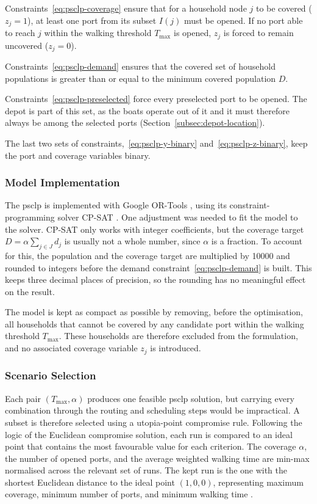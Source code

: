 \documentclass[12pt]{article}
\begin{document}
Constraints~\eqref{eq:psclp-coverage} ensure that for a household node \(j\) to be covered (\(z_j = 1\)), at least one port from its subset \(I(j)\) must be opened. If no port able to reach \(j\) within the walking threshold \(T_{\max}\) is opened, \(z_j\) is forced to remain uncovered (\(z_j = 0\)).

Constraints~\eqref{eq:psclp-demand} ensures that the covered set of household populations is greater than or equal to the minimum covered population \(D\).

Constraints~\eqref{eq:psclp-preselected} force every preselected port to be opened. The depot is part of this set, as the boats operate out of it and it must therefore always be among the selected ports (Section~\ref{subsec:depot-location}).

The last two sets of constraints,~\eqref{eq:psclp-y-binary} and~\eqref{eq:psclp-z-binary}, keep the port and coverage variables binary.

\subsubsection{Model Implementation}
\label{subsubsec:psclp-implementation}

The \ac{psclp} is implemented with Google OR-Tools \parencite{ortools}, using its constraint-programming solver CP-SAT \parencite{cpsat}. One adjustment was needed to fit the model to the solver. CP-SAT only works with integer coefficients, but the coverage target \(D = \alpha \sum_{j \in J} d_j\) is usually not a whole number, since \(\alpha\) is a fraction. To account for this, the population and the coverage target are multiplied by \num{10000} and rounded to integers before the demand constraint~\eqref{eq:psclp-demand} is built. This keeps three decimal places of precision, so the rounding has no meaningful effect on the result.

The model is kept as compact as possible by removing, before the optimisation, all households that cannot be covered by any candidate port within the walking threshold \(T_{\max}\). These households are therefore excluded from the formulation, and no associated coverage variable \(z_j\) is introduced.

\subsubsection{Scenario Selection}
\label{subsubsec:scenario-selection}

Each pair \((T_{\max}, \alpha)\) produces one feasible \ac{psclp} solution, but carrying every combination through the routing and scheduling steps would be impractical. A subset is therefore selected using a utopia-point compromise rule. Following the logic of the Euclidean compromise solution, each run is compared to an ideal point that contains the most favourable value for each criterion. The coverage \(\alpha\), the number of opened ports, and the average weighted walking time are min-max normalised across the relevant set of runs. The kept run is the one with the shortest Euclidean distance to the ideal point \((1, 0, 0)\), representing maximum coverage, minimum number of ports, and minimum walking time \parencite{voorneveld2011euclidean}.
\end{document}
